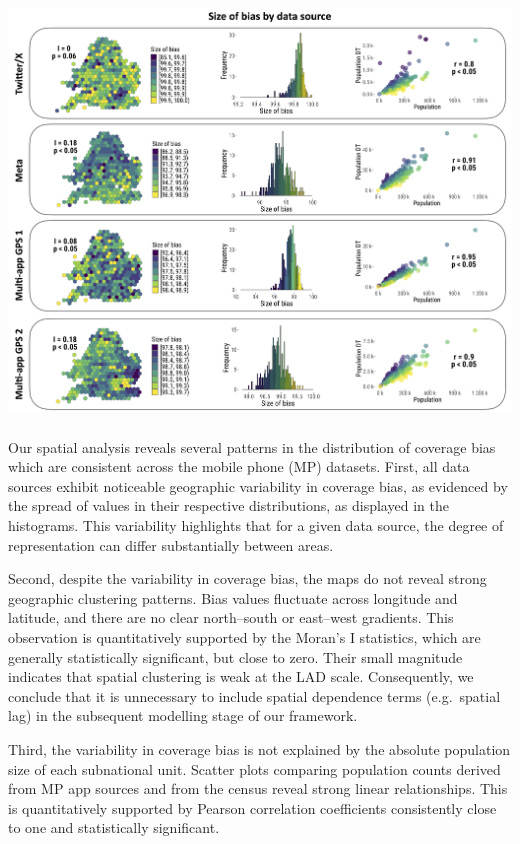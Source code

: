 \documentclass[]{rsos}%
\begin{document}
\includegraphics[width=5.55208in,height=4.35417in]{figures/Fig-size-bias.png}

Our spatial analysis reveals several patterns in the distribution of
coverage bias which are consistent across the mobile phone (MP)
datasets. First, all data sources exhibit noticeable geographic
variability in coverage bias, as evidenced by the spread of values in
their respective distributions, as displayed in the histograms. This
variability highlights that for a given data source, the degree of
representation can differ substantially between areas.

Second, despite the variability in coverage bias, the maps do not reveal
strong geographic clustering patterns. Bias values fluctuate across
longitude and latitude, and there are no clear north--south or east--west
gradients. This observation is quantitatively supported by the Moran's I
statistics, which are generally statistically significant, but close to
zero. Their small magnitude indicates that spatial clustering is weak at
the LAD scale. Consequently, we conclude that it is unnecessary to
include spatial dependence terms (e.g.~spatial lag) in the subsequent
modelling stage of our framework.

Third, the variability in coverage bias is not explained by the absolute
population size of each subnational unit. Scatter plots comparing
population counts derived from MP app sources and from the census reveal
strong linear relationships. This is quantitatively supported by Pearson
correlation coefficients consistently close to one and statistically
significant.
\end{document}
